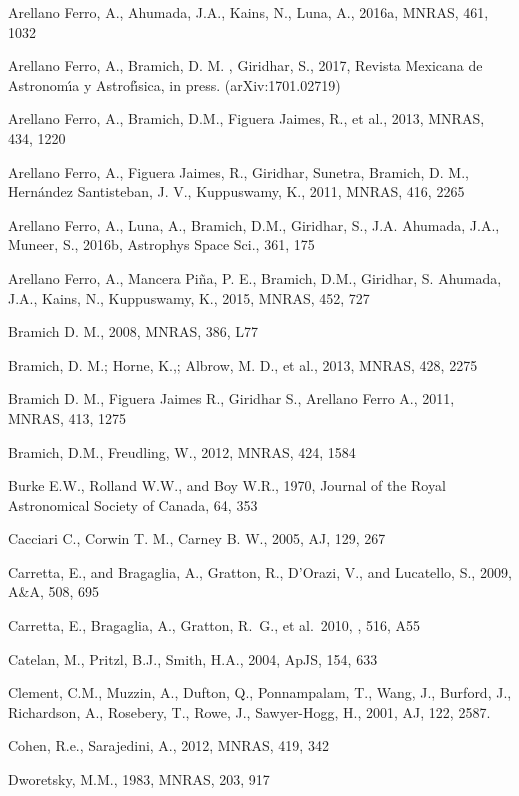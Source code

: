 \documentclass[journal]{rmaa}
\newcommand{\1}{\'{\i}}
\begin{document}
\begin{thebibliography}

\bibitem{} Arellano Ferro, A., Ahumada, J.A., Kains, N., Luna, A., 2016a, MNRAS, 461,
1032

\bibitem{} Arellano Ferro, A., Bramich, D. M. , Giridhar, S., 2017, Revista Mexicana
de Astronom\1a y Astrof\1sica, in press. (arXiv:1701.02719)

\bibitem{} Arellano Ferro, A., Bramich, D.M., Figuera Jaimes, R., et al., 2013,
MNRAS, 434, 1220

\bibitem{} Arellano Ferro, A., Figuera Jaimes, R., Giridhar, Sunetra, Bramich, D. M.,
Hern\'andez Santisteban, J. V., Kuppuswamy, K., 2011, MNRAS, 416, 2265

\bibitem{} Arellano Ferro, A., Luna, A.,  Bramich, D.M., Giridhar, S., J.A.
Ahumada, J.A., Muneer, S., 2016b, Astrophys Space Sci., 361, 175

\bibitem{} Arellano Ferro, A., Mancera Pi\~na, P. E., Bramich, D.M., Giridhar, S.
Ahumada, J.A., Kains, N., Kuppuswamy, K., 2015, MNRAS, 452, 727

\bibitem{} Bramich D. M., 2008, MNRAS, 386, L77

\bibitem{} Bramich, D. M.; Horne, K.,; Albrow, M. D., et al., 2013, MNRAS, 428, 2275

\bibitem{} Bramich D. M., Figuera Jaimes R., Giridhar S., Arellano Ferro A., 2011,
MNRAS, 413, 1275

\bibitem{} Bramich, D.M., Freudling, W., 2012, MNRAS, 424, 1584

\bibitem{} Burke E.W., Rolland W.W., and Boy W.R., 1970, Journal of the Royal
Astronomical Society of Canada, 64, 353

\bibitem{} Cacciari C., Corwin T. M., Carney B. W., 2005, AJ, 129, 267

\bibitem{} Carretta, E., and Bragaglia, A., Gratton, R., D'Orazi, V., and Lucatello,
S., 2009, A\&A, 508, 695

\bibitem{} Carretta, E., Bragaglia, A., Gratton, R.~G., et al.\ 2010, \aap, 516, A55

\bibitem{} Catelan, M., Pritzl, B.J., Smith, H.A., 2004, ApJS, 154, 633

\bibitem{} Clement, C.M., Muzzin, A., Dufton, Q., Ponnampalam, T., Wang, J., Burford,
J., Richardson, A., Rosebery, T., Rowe, J., Sawyer-Hogg, H., 2001, AJ, 122, 2587.

\bibitem{} Cohen, R.e., Sarajedini, A., 2012, MNRAS, 419, 342

\bibitem{} Dworetsky, M.M., 1983, MNRAS, 203, 917


\end{thebibliography}
\end{document}
